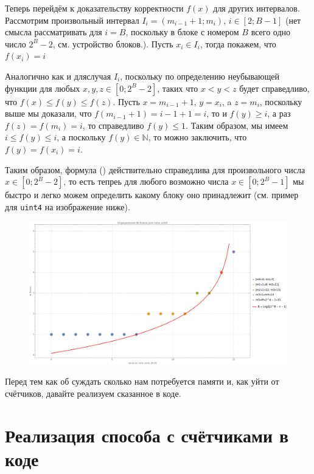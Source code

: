 Теперь перейдём к доказательству корректности \(f(x)\) для других интервалов.
Рассмотрим произвольный интервал  \(I_i = (m_{i-1} + 1; m_i)\), \(i \in [2; B-1]\) (нет смысла рассматривать для \(i = B\), поскольку в блоке с номером \(B\) всего одно число \(2^B-2\), см. устройство блоков.). Пусть \(x_i \in I_i\), тогда покажем, что \(f(x_i) = i\)

Аналогично как и дляслучая \(I_i\), поскольку по определению неубывающей функции для любых \(x, y, z \in [0; 2^B - 2]\), таких что \(x < y < z\) будет справедливо, что \(f(x) \le f(y) \le f(z)\). Пусть \(x = m_{i-1}+1\), \(y = x_i\), a \(z = m_i\), поскольку выше мы доказали, что \(f(m_{i-1}+1) = i -1 + 1 = i\), то и \(f(y) \ge i\), а раз \(f(z) = f(m_i) = i\), то справедливо \(f(y) \le 1\). Таким образом, мы имеем \(i \le f(y) \le i\), а поскольку \(f(y) \in \mathbb{N}\), то можно заключить, что \(f(y) = f(x_i) = i\).

Таким образом, формула () действительно справедлива для произвольного числа \(x \in [0; 2^B - 2]\), то есть тепреь для любого возможно числа \(x \in [0; 2^B - 1]\) мы быстро и легко можем определить какому блоку оно принадлежит (см. пример для \texttt{uint4} на изображение ниже).
\begin{figure}[H]
    \centering
    \includegraphics[width=1.0\textwidth]{../../resources/number_block_for_uint4.png}
    \caption{}
\end{figure}
 
Перед тем как об суждать сколько нам потребуется памяти и, как уйти от счётчиков, давайте реализуем сказанное в коде.

\section{Реализация способа с счётчиками в коде}

